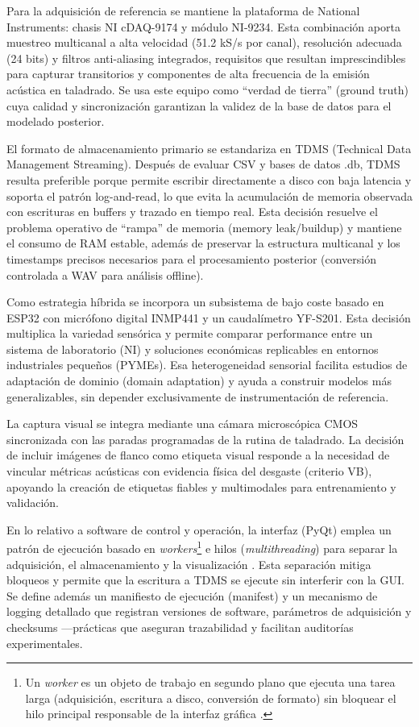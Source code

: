 \documentclass[12pt, letterpaper]{report}
\begin{document}
Para la adquisición de referencia se mantiene la plataforma de National Instruments: chasis NI cDAQ-9174 y módulo NI-9234. Esta combinación aporta muestreo multicanal a alta velocidad (51.2 kS/s por canal), resolución adecuada (24 bits) y filtros anti-aliasing integrados, requisitos que resultan imprescindibles para capturar transitorios y componentes de alta frecuencia de la emisión acústica en taladrado. Se usa este equipo como “verdad de tierra” (ground truth) cuya calidad y sincronización garantizan la validez de la base de datos para el modelado posterior.

El formato de almacenamiento primario se estandariza en TDMS (Technical Data Management Streaming). Después de evaluar CSV y bases de datos .db, TDMS resulta preferible porque permite escribir directamente a disco con baja latencia y soporta el patrón log-and-read, lo que evita la acumulación de memoria observada con escrituras en buffers y trazado en tiempo real. Esta decisión resuelve el problema operativo de “rampa” de memoria (memory leak/buildup) y mantiene el consumo de RAM estable, además de preservar la estructura multicanal y los timestamps precisos necesarios para el procesamiento posterior (conversión controlada a WAV para análisis offline).

Como estrategia híbrida se incorpora un subsistema de bajo coste basado en ESP32 con micrófono digital INMP441 y un caudalímetro YF-S201. Esta decisión multiplica la variedad sensórica y permite comparar performance entre un sistema de laboratorio (NI) y soluciones económicas replicables en entornos industriales pequeños (PYMEs). Esa heterogeneidad sensorial facilita estudios de adaptación de dominio (domain adaptation) y ayuda a construir modelos más generalizables, sin depender exclusivamente de instrumentación de referencia.

La captura visual se integra mediante una cámara microscópica CMOS sincronizada con las paradas programadas de la rutina de taladrado. La decisión de incluir imágenes de flanco como etiqueta visual responde a la necesidad de vincular métricas acústicas con evidencia física del desgaste (criterio VB), apoyando la creación de etiquetas fiables y multimodales para entrenamiento y validación.

En lo relativo a software de control y operación, la interfaz (PyQt) emplea un patrón de ejecución basado en \textit{workers}\footnote{Un \textit{worker} es un objeto de trabajo en segundo plano que ejecuta una tarea larga (adquisición, escritura a disco, conversión de formato) sin bloquear el hilo principal responsable de la interfaz gráfica \cite{moore2019}.} e hilos (\textit{multithreading}) para separar la adquisición, el almacenamiento y la visualización \cite{moore2019}. Esta separación mitiga bloqueos y permite que la escritura a TDMS se ejecute sin interferir con la GUI. Se define además un manifiesto de ejecución (manifest) y un mecanismo de logging detallado que registran versiones de software, parámetros de adquisición y checksums ---prácticas que aseguran trazabilidad y facilitan auditorías experimentales.
\end{document}
